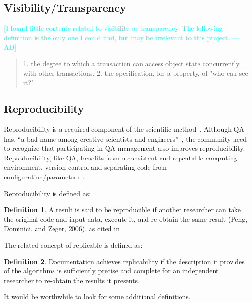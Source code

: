 \documentclass[letterpaper,cleveref]{lipics-v2019}
\newcommand{\authornote}[3]{\textcolor{#1}{[#3 ---#2]}}
\newcommand{\authornote}[3]{}
\newcommand{\ad}[1]{\authornote{cyan}{AD}{#1}} %
\theoremstyle{definition}
\newtheorem{defn}{Definition}
\begin{document}
\subsection{Visibility/Transparency}
    \ad{I found little contents related to visibility or transparency. The following definition is the only one I could find, but may be irrelevant to this project.}
    \begin{quotation}
        1. the degree to which a transaction can access object state concurrently with other transactions. 2. the specification, for a property, of "who can see it?"~\cite{ISO/IEC/IEEE24765}
    \end{quotation}
      
\subsection{Reproducibility}

Reproducibility is a required component of the scientific
method~\cite{Davison2012}.  Although QA has, ``a bad name among creative
scientists and engineers''~\cite[p.~352]{Roache1998}, the community need to
recognize that participating in QA management also improves reproducibility.
Reproducibility, like QA, benefits from a consistent and repeatable computing
environment, version control and separating code from
configuration/parameters~\cite{Davison2012}.

Reproducibility is defined as:

\begin{defn}
A result is said to be reproducible if another researcher can take the original
code and input data, execute it, and re-obtain the same result (Peng, Dominici,
and Zeger, 2006), as cited in \citet{BenureauAndRougier2017}.
\end{defn}

The related concept of replicable is defined as:

\begin{defn}
Documentation achieves replicability if the description it provides of the
algorithms is sufficiently precise and complete for an independent researcher to
re-obtain the results it presents.  \citep{BenureauAndRougier2017}
\end{defn}

It would be worthwhile to look for some additional definitions.
\end{document}
